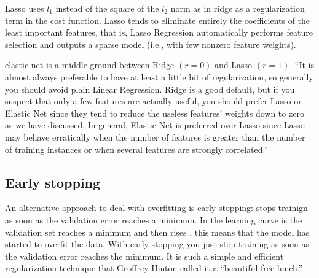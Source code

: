 \documentclass[12pt]{report}
\begin{document}
Lasso uses $l_1$ instead of the square of the $l_2$ norm as in ridge as a regularization term in the cost function. Lasso tends to eliminate entirely the coefficients of the least important features, that is, Lasso Regression automatically performs feature selection and outputs a sparse model (i.e., with few nonzero feature weights).

elastic net is a middle ground between Ridge $(r=0)$ and Lasso $(r=1)$. “It is almost always preferable to have at least a little bit of regularization, so generally you should avoid plain Linear Regression. Ridge is a good default, but if you suspect that only a few features are actually useful, you should prefer Lasso or Elastic Net since they tend to reduce the useless features’ weights down to zero as we have discussed. In general, Elastic Net is preferred over Lasso since Lasso may behave erratically when the number of features is greater than the number of training instances or when several features are strongly correlated.”

\subsection{Early stopping}
An alternative approach to deal with overfitting is early stopping: stops trainign as soon as the validation error reaches a minimum. In the learning curve is the validation set reaches a minimum and then rises , this means that the model has started to overfit the data. With early stopping you just stop training as soon as the validation error reaches the minimum. It is such a simple and efficient regularization technique that Geoffrey Hinton called it a “beautiful free lunch.”
\end{document}
